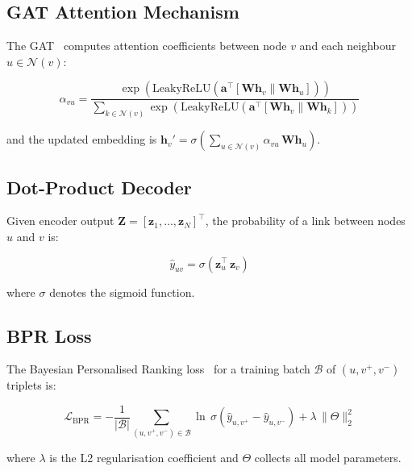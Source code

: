 \documentclass[12pt,a4paper]{article}
\begin{document}
\subsection{GAT Attention Mechanism}

The GAT~\cite{velickovic2018} computes attention coefficients between node $v$ and each neighbour $u \in \mathcal{N}(v)$:

\begin{equation}
\alpha_{vu} = \frac{\exp\!\left(\text{LeakyReLU}\!\left(\mathbf{a}^\top[\mathbf{W}\mathbf{h}_v \| \mathbf{W}\mathbf{h}_u]\right)\right)}{\sum_{k \in \mathcal{N}(v)} \exp\!\left(\text{LeakyReLU}\!\left(\mathbf{a}^\top[\mathbf{W}\mathbf{h}_v \| \mathbf{W}\mathbf{h}_k]\right)\right)}
\label{eq:gat}
\end{equation}

and the updated embedding is $\mathbf{h}_v' = \sigma\!\left(\sum_{u \in \mathcal{N}(v)} \alpha_{vu}\,\mathbf{W}\mathbf{h}_u\right)$.

\subsection{Dot-Product Decoder}

Given encoder output $\mathbf{Z} = [\mathbf{z}_1, \ldots, \mathbf{z}_N]^\top$, the probability of a link between nodes $u$ and $v$ is:

\begin{equation}
\hat{y}_{uv} = \sigma\!\left(\mathbf{z}_u^\top\,\mathbf{z}_v\right)
\label{eq:decoder}
\end{equation}

where $\sigma$ denotes the sigmoid function.

\subsection{BPR Loss}

The Bayesian Personalised Ranking loss~\cite{rendle2009} for a training batch $\mathcal{B}$ of $(u, v^+, v^-)$ triplets is:

\begin{equation}
\mathcal{L}_{\text{BPR}} = -\frac{1}{|\mathcal{B}|}\sum_{(u,v^+,v^-) \in \mathcal{B}} \ln\,\sigma\!\left(\hat{y}_{u,v^+} - \hat{y}_{u,v^-}\right) + \lambda\,\|\Theta\|_2^2
\label{eq:bpr}
\end{equation}

where $\lambda$ is the L2 regularisation coefficient and $\Theta$ collects all model parameters.
\end{document}
